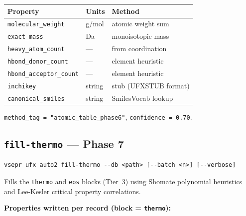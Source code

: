 \documentclass[11pt,letterpaper]{article}
\begin{document}
\begin{center}
\begin{tabular}{lll}
\toprule
Property & Units & Method \\
\midrule
\texttt{molecular\_weight}      & g/mol   & atomic weight sum \\
\texttt{exact\_mass}            & Da      & monoisotopic mass \\
\texttt{heavy\_atom\_count}     & ---     & from coordination \\
\texttt{hbond\_donor\_count}    & ---     & element heuristic \\
\texttt{hbond\_acceptor\_count} & ---     & element heuristic \\
\texttt{inchikey}               & string  & stub (UFXSTUB format) \\
\texttt{canonical\_smiles}      & string  & SmilesVocab lookup \\
\bottomrule
\end{tabular}
\end{center}

\texttt{method\_tag = "atomic\_table\_phase6"}, \texttt{confidence = 0.70}.

\subsection{\texttt{fill-thermo} --- Phase 7}

\begin{lstlisting}
vsepr ufx auto2 fill-thermo --db <path> [--batch <n>] [--verbose]
\end{lstlisting}

Fills the \texttt{thermo} and \texttt{eos} blocks (Tier~3) using
Shomate polynomial heuristics and Lee-Kesler critical property
correlations.

\textbf{Properties written per record (block = \texttt{thermo}):}
\end{document}
